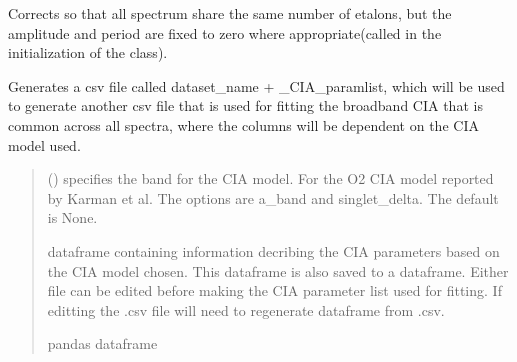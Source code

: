 \documentclass[letterpaper,10pt,english]{sphinxmanual}
\begin{document}
\begin{fulllineitems}
\begin{fulllineitems}
\end{fulllineitems}


\begin{fulllineitems}
\label{\detokenize{MATS:MATS.dataset.Dataset.correct_etalon_list}}
\pysigstartsignatures
{}
\pysigstopsignatures
\sphinxAtStartPar
Corrects so that all spectrum share the same number of etalons, but the amplitude and period are fixed to zero where appropriate(called in the initialization of the class).

\end{fulllineitems}


\begin{fulllineitems}
\label{\detokenize{MATS:MATS.dataset.Dataset.generate_CIA_paramlist}}
\pysigstartsignatures
{}
\pysigstopsignatures
\sphinxAtStartPar
Generates a csv file called dataset\_name + \_CIA\_paramlist, which will be used to generate another csv file that is used for fitting the broadband CIA that is common across all spectra, where the columns will be dependent on the CIA model used.
\begin{quote}\begin{description}
\sphinxAtStartPar
{} (\sphinxstyleliteralemphasis{\sphinxupquote{, }}) \textendash{} specifies the band for the CIA model. For the O2 CIA model reported by Karman et al. The options are a\_band and singlet\_delta. The default is None.

\sphinxAtStartPar
{} \textendash{} dataframe containing information decribing the CIA parameters based on the CIA model chosen.  This dataframe is also saved to a dataframe.  Either file can be edited before making the CIA parameter list used for fitting.  If editting the .csv file will need to regenerate dataframe from .csv.

\sphinxAtStartPar
pandas dataframe


\end{description}
\end{quote}
\end{fulllineitems}
\end{fulllineitems}
\end{document}
